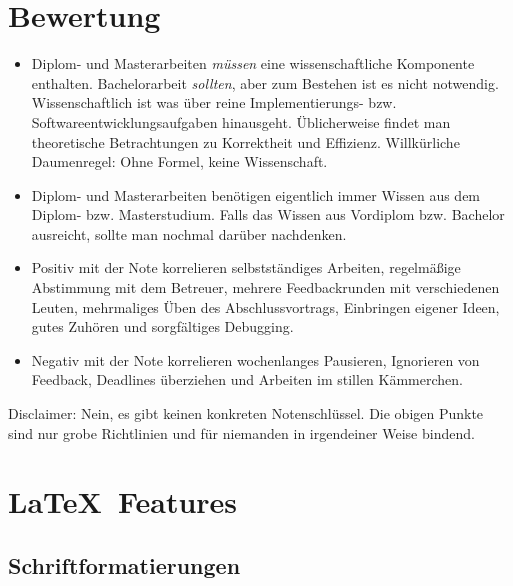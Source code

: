 \section{Bewertung}

\begin{itemize}
  \item Diplom- und Masterarbeiten \emph{müssen} eine wissenschaftliche Komponente enthalten.
    Bachelorarbeit \emph{sollten}, aber zum Bestehen ist es nicht notwendig.
    Wissenschaftlich ist was über reine Implementierungs- bzw. Softwareentwicklungsaufgaben hinausgeht.
    Üblicherweise findet man theoretische Betrachtungen zu Korrektheit und Effizienz.
    Willkürliche Daumenregel: Ohne Formel, keine Wissenschaft.
  \item Diplom- und Masterarbeiten benötigen eigentlich immer Wissen aus dem Diplom- bzw. Masterstudium.
    Falls das Wissen aus Vordiplom bzw. Bachelor ausreicht,
    sollte man nochmal darüber nachdenken.
  \item Positiv mit der Note korrelieren
    selbstständiges Arbeiten,
    regelmäßige Abstimmung mit dem Betreuer,
    mehrere Feedbackrunden mit verschiedenen Leuten,
    mehrmaliges Üben des Abschlussvortrags,
    Einbringen eigener Ideen,
    gutes Zuhören
    und sorgfältiges Debugging.
  \item Negativ mit der Note korrelieren
    wochenlanges Pausieren,
    Ignorieren von Feedback,
    Deadlines überziehen
    und Arbeiten im stillen Kämmerchen.
\end{itemize}

Disclaimer:
Nein, es gibt keinen konkreten Notenschlüssel.
Die obigen Punkte sind nur grobe Richtlinien und für niemanden in irgendeiner Weise bindend.

\section{\LaTeX\ Features}

\subsection{Schriftformatierungen}

